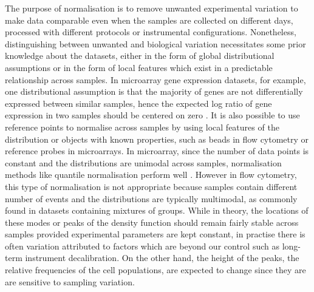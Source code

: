 The purpose of normalisation is to remove unwanted experimental variation to make data comparable even when the samples are
collected on different days, processed with different protocols or instrumental configurations.
Nonetheless, distinguishing between unwanted and biological variation necessitates some prior knowledge about the datasets,
either in the form of global distributional assumptions or in the form of local features which exist in a predictable relationship across samples.
In microarray gene expression datasets, for example, one distributional assumption is that the majority of genes are not differentially expressed between similar samples,
hence the expected log ratio of gene expression in two samples should be centered on zero \citep{Smyth:2003ie,Bolstad:2003ia}.  
It is also possible to use reference points to normalise across samples
by using local features of the distribution or objects with known properties, such as beads in flow cytometry or reference probes in microarrays.
In microarray, since the number of data points is constant and the distributions are unimodal across samples,
normalisation methods like quantile normalisation perform well \citep{Bolstad:2003ia}.
However in flow cytometry, this type of normalisation is not appropriate because samples contain different number of events and 
the distributions are typically multimodal, as commonly found in datasets containing mixtures of groups.
While in theory, the locations of these modes or peaks of the density function should remain fairly stable across samples provided experimental parameters are kept constant,
in practise there is often variation attributed to factors which are beyond our control such as long-term instrument decalibration.
On the other hand, the height of the peaks, the relative frequencies of the cell populations, are expected to change since they are
are sensitive to sampling variation.
